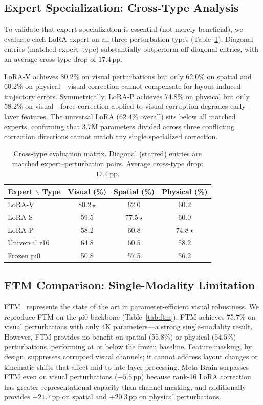 \documentclass[10pt,twocolumn]{article}
\newcommand{\ours}{Meta-Brain}
\newcommand{\pp}{\,\text{pp}}
\begin{document}
\subsection{Expert Specialization: Cross-Type Analysis}
\label{sec:cross_type}

To validate that expert specialization is essential (not merely beneficial), we evaluate each LoRA expert on all three perturbation types (Table~\ref{tab:cross_type}).
Diagonal entries (matched expert--type) substantially outperform off-diagonal entries, with an average cross-type drop of $17.4\pp$.

LoRA-V achieves 80.2\% on visual perturbations but only 62.0\% on spatial and 60.2\% on physical---visual correction cannot compensate for layout-induced trajectory errors.
Symmetrically, LoRA-P achieves 74.8\% on physical but only 58.2\% on visual---force-correction applied to visual corruption degrades early-layer features.
The universal LoRA (62.4\% overall) sits below all matched experts, confirming that 3.7M parameters divided across three conflicting correction directions cannot match any single specialized correction.

\begin{table}[t]
\centering
\caption{Cross-type evaluation matrix. Diagonal (starred) entries are matched expert--perturbation pairs. Average cross-type drop: $17.4\pp$.}
\label{tab:cross_type}
\small
\begin{tabular}{@{}lccc@{}}
\toprule
Expert $\backslash$ Type & Visual (\%) & Spatial (\%) & Physical (\%) \\
\midrule
LoRA-V & 80.2\,$\star$ & 62.0 & 60.2 \\
LoRA-S & 59.5 & 77.5\,$\star$ & 60.0 \\
LoRA-P & 58.2 & 60.8 & 74.8\,$\star$ \\
\midrule
Universal r16 & 64.8 & 60.5 & 58.2 \\
Frozen pi0 & 50.8 & 57.5 & 56.2 \\
\bottomrule
\end{tabular}
\end{table}


\subsection{FTM Comparison: Single-Modality Limitation}
\label{sec:ftm}

FTM~\cite{yang2025ftm} represents the state of the art in parameter-efficient visual robustness.
We reproduce FTM on the pi0 backbone (Table~\ref{tab:ftm}).
FTM achieves 75.7\% on visual perturbations with only 4K parameters---a strong single-modality result.
However, FTM provides no benefit on spatial (55.8\%) or physical (54.5\%) perturbations, performing at or below the frozen baseline.
Feature masking, by design, suppresses corrupted visual channels; it cannot address layout changes or kinematic shifts that affect mid-to-late-layer processing.
\ours{} surpasses FTM even on visual perturbations ($+5.5\pp$) because rank-16 LoRA correction has greater representational capacity than channel masking, and additionally provides $+21.7\pp$ on spatial and $+20.3\pp$ on physical perturbations.
\end{document}
